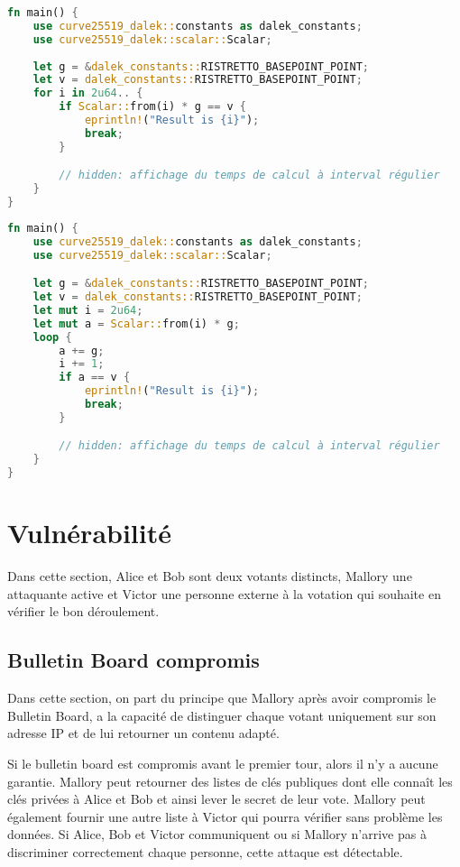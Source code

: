 \documentclass[../report]{subfiles}
\begin{document}
\begin{lstlisting}[language=Rust,caption={Vitesse de calcul résultat final (très naif)},style=numbers,label={lst:perf:resultat-1}]
fn main() {
    use curve25519_dalek::constants as dalek_constants;
    use curve25519_dalek::scalar::Scalar;
        
    let g = &dalek_constants::RISTRETTO_BASEPOINT_POINT;
    let v = dalek_constants::RISTRETTO_BASEPOINT_POINT;
    for i in 2u64.. {
        if Scalar::from(i) * g == v {
            eprintln!("Result is {i}");
            break;
        }

        // hidden: affichage du temps de calcul à interval régulier
    }
}
\end{lstlisting}%
\begin{lstlisting}[language=Rust,caption={Vitesse de calcul résultat final (un peu moins naif)},style=numbers,label={lst:perf:resultat-2}]
fn main() {
    use curve25519_dalek::constants as dalek_constants;
    use curve25519_dalek::scalar::Scalar;

    let g = &dalek_constants::RISTRETTO_BASEPOINT_POINT;
    let v = dalek_constants::RISTRETTO_BASEPOINT_POINT;
    let mut i = 2u64;
    let mut a = Scalar::from(i) * g;
    loop {
        a += g;
        i += 1;
        if a == v {
            eprintln!("Result is {i}");
            break;
        }

        // hidden: affichage du temps de calcul à interval régulier
    }
}
\end{lstlisting}%

\chapter{Vulnérabilité}

Dans cette section, Alice et Bob sont deux votants distincts, Mallory une attaquante active et Victor une personne externe à la votation qui 
souhaite en vérifier le bon déroulement.

\section{Bulletin Board compromis}

Dans cette section, on part du principe que Mallory après avoir compromis le Bulletin Board, a la capacité
de distinguer chaque votant uniquement sur son adresse IP et de lui retourner un contenu adapté.

Si le bulletin board est compromis avant le premier tour, alors il n'y a aucune garantie.
Mallory peut retourner des listes de clés publiques dont elle connaît les clés privées à Alice et Bob et ainsi lever 
le secret de leur vote. Mallory peut également fournir une autre liste à Victor qui pourra vérifier sans problème les données.
Si Alice, Bob et Victor communiquent ou si Mallory n'arrive pas à discriminer correctement chaque personne, cette attaque est 
détectable.
\end{document}
